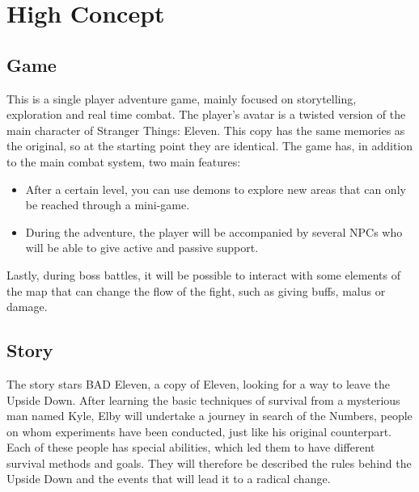 \section{High Concept}

\subsection{Game}

This is a single player adventure game, mainly focused on storytelling, exploration and real time combat. The player's avatar is a twisted version of the
main character of Stranger Things: Eleven. This copy has the same memories as the original, so at the starting point they are identical.
The game has, in addition to the main combat system, two main features:

\begin{itemize}
	\item After a certain level, you can use demons to explore new areas that can only be reached through a mini-game.
	\item During the adventure, the player will be accompanied by several NPCs who will be able to give active and passive support.
\end{itemize}

Lastly, during boss battles, it will be possible to interact with some elements of the map that can change the flow of the fight, such as giving buffs, malus or damage.

\subsection{Story}
The story stars BAD Eleven, a copy of Eleven, looking for a way to leave the Upside Down. After learning the basic techniques of survival from a mysterious man named Kyle, Elby will undertake a journey in search of the Numbers, people on whom experiments have been conducted, just like his original counterpart. Each of these people has special abilities, which led them to have different survival methods and goals. They will therefore be described the rules behind the Upside Down and the events that will lead it to a radical change.